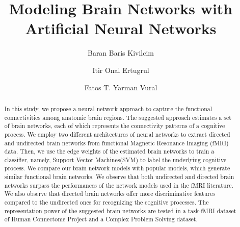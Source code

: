 \documentclass[runningheads]{llncs}
\begin{document}
%
\title{Modeling Brain Networks with Artificial Neural Networks}

%
%
\author{Baran Baris Kivilcim \and
Itir Onal Ertugrul \and
Fatos T. Yarman Vural}
%


\maketitle              %
%
\begin{abstract}

In this study, we propose a neural network approach to capture the functional connectivities among anatomic brain regions. The suggested approach estimates a set of brain networks, each of which represents the connectivity patterns of a cognitive process. We employ two different architectures of neural networks to extract directed and undirected brain networks from functional Magnetic Resonance Imaging (fMRI) data. Then, we use the edge weights of the estimated brain networks to train a classifier, namely, Support Vector Machines(SVM) to label the underlying cognitive process. We compare our brain network models with popular models, which generate similar functional brain networks. We observe that both undirected and directed brain networks surpass the performances of the network models used in the fMRI literature. We also observe that directed brain networks offer more discriminative features compared to the undirected ones for  recognizing the cognitive processes. The representation power of the suggested brain networks are tested in a task-fMRI dataset of Human Connectome Project and a Complex Problem Solving dataset.


\end{abstract}
\end{document}
